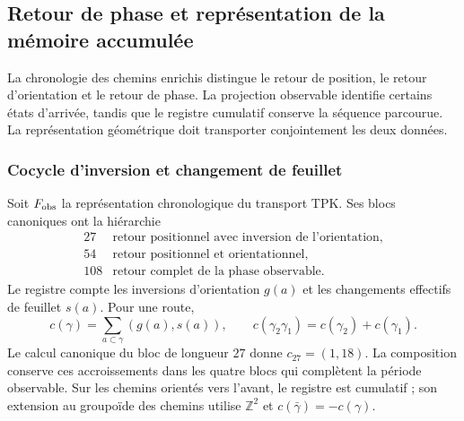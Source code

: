 
\subsection{Retour de phase et représentation de la mémoire accumulée}
\label{vii:sec:retorno-memoria-gravedad}

La chronologie des chemins enrichis distingue le retour de position,
le retour d’orientation et le retour de phase. La projection observable
identifie certains états d’arrivée, tandis que le registre cumulatif
conserve la séquence parcourue. La représentation géométrique doit
transporter conjointement les deux données.

\subsubsection{Cocycle d'inversion et changement de feuillet}
\label{vii:subsec:cociclo-memoria}

Soit \(F_{\rm obs}\) la représentation chronologique du transport TPK.
Ses blocs canoniques ont la hiérarchie
\[
\begin{array}{c|l}
27&\text{retour positionnel avec inversion de l’orientation},\\
54&\text{retour positionnel et orientationnel},\\
108&\text{retour complet de la phase observable}.
\end{array}
\]
Le registre compte les inversions d'orientation \(g(a)\) et les
changements effectifs de feuillet \(s(a)\). Pour une route,
\begin{equation}
 c(\gamma)=\sum_{a\subset\gamma}(g(a),s(a)),\qquad
 c(\gamma_2\gamma_1)=c(\gamma_2)+c(\gamma_1).
 \label{vii:eq:cociclo-ruta}
\end{equation}
Le calcul canonique du bloc de longueur \(27\) donne
\(c_{27}=(1,18)\). La composition conserve ces accroissements dans
les quatre blocs qui complètent la période observable.
Sur les chemins orientés vers l’avant, le registre est cumulatif ;
son extension au groupoïde des chemins utilise \(\mathbb Z^2\) et
\(c(\bar\gamma)=-c(\gamma)\).

